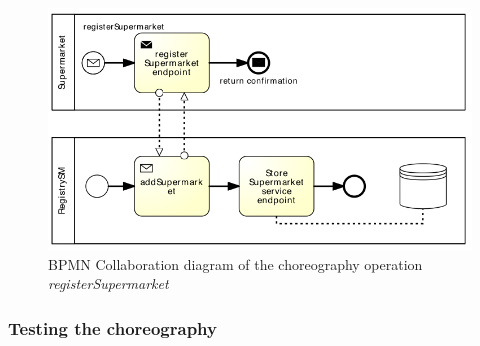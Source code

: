 \begin{figure}[htbp]
\begin{center}
	\includegraphics{images/registerSupermarketworkflow}
\caption{BPMN Collaboration diagram of the choreography operation \emph{registerSupermarket}}
\label{registerSupermarketworkflow}
\end{center}
\end{figure}

\subsubsection{Testing the choreography}

